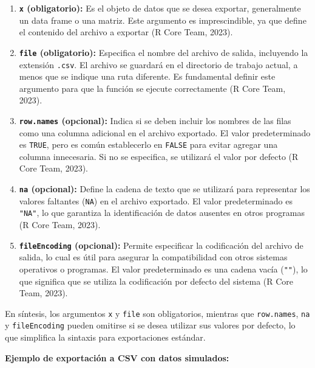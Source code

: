 \documentclass[
  spanish,
  a4paper,
  DIV=11,
  numbers=noendperiod,
  onepage,
  openany]{scrreprt}
\begin{document}
\begin{enumerate}
\def\labelenumi{\arabic{enumi}.}
\item
  \textbf{\texttt{x} (obligatorio):} Es el objeto de datos que se desea
  exportar, generalmente un data frame o una matriz. Este argumento es
  imprescindible, ya que define el contenido del archivo a exportar (R
  Core Team, 2023).
\item
  \textbf{\texttt{file} (obligatorio):} Especifica el nombre del archivo
  de salida, incluyendo la extensión \texttt{.csv}. El archivo se
  guardará en el directorio de trabajo actual, a menos que se indique
  una ruta diferente. Es fundamental definir este argumento para que la
  función se ejecute correctamente (R Core Team, 2023).
\item
  \textbf{\texttt{row.names} (opcional):} Indica si se deben incluir los
  nombres de las filas como una columna adicional en el archivo
  exportado. El valor predeterminado es \texttt{TRUE}, pero es común
  establecerlo en \texttt{FALSE} para evitar agregar una columna
  innecesaria. Si no se especifica, se utilizará el valor por defecto (R
  Core Team, 2023).
\item
  \textbf{\texttt{na} (opcional):} Define la cadena de texto que se
  utilizará para representar los valores faltantes (\texttt{NA}) en el
  archivo exportado. El valor predeterminado es \texttt{"NA"}, lo que
  garantiza la identificación de datos ausentes en otros programas (R
  Core Team, 2023).
\item
  \textbf{\texttt{fileEncoding} (opcional):} Permite especificar la
  codificación del archivo de salida, lo cual es útil para asegurar la
  compatibilidad con otros sistemas operativos o programas. El valor
  predeterminado es una cadena vacía (\texttt{""}), lo que significa que
  se utiliza la codificación por defecto del sistema (R Core Team,
  2023).
\end{enumerate}

En síntesis, los argumentos \texttt{x} y \texttt{file} son obligatorios,
mientras que \texttt{row.names}, \texttt{na} y \texttt{fileEncoding}
pueden omitirse si se desea utilizar sus valores por defecto, lo que
simplifica la sintaxis para exportaciones estándar.

\textbf{Ejemplo de exportación a CSV con datos simulados:}
\end{document}
